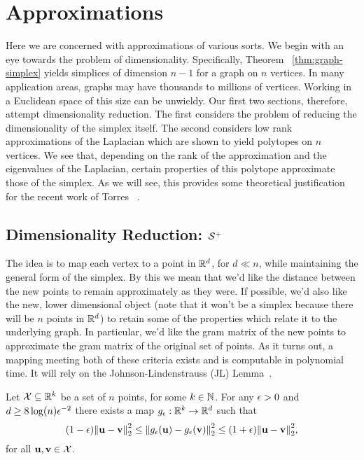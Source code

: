 \section{Approximations} 
\label{sec:algorithmics_approximations}
Here we are concerned  with  approximations of various sorts. We begin  with an eye towards the problem of  dimensionality. Specifically, Theorem ~\ref{thm:graph-simplex} yields simplices of dimension $n-1$ for a graph on $n$ vertices. In  many application areas, graphs may have thousands  to  millions of vertices. Working in a Euclidean space  of  this  size can be unwieldy. Our first two  sections,  therefore, attempt dimensionality reduction. The first  considers the problem of reducing the dimensionality of the simplex itself. The second considers low rank approximations of  the Laplacian which are  shown to yield polytopes on  $n$ vertices. We see that, depending on the rank of the  approximation and the eigenvalues of the Laplacian, certain properties of this polytope approximate  those of the simplex. As we will see, this provides some  theoretical justification for  the  recent work of Torres \etal~\cite{torres2019geometric}. 

\subsection{Dimensionality  Reduction: \texorpdfstring{$\mathcal{S}^+$}{the inverse simplex}}
\label{sec:algorithmics_JL}
The idea is to  map each vertex to a  point in $\mathbb{R}^d$, for $d\ll n$, while maintaining the general form of the simplex. By this we mean that we'd like the distance between the new  points  to remain approximately  as they  were. If possible, we'd also  like the new, lower  dimensional  object (note that it won't  be  a simplex because there will  be  $n$ points in $ \mathbb{R}^d$) to retain some of the properties which  relate it  to the underlying graph. In  particular, we'd like the gram matrix  of the new  points to  approximate the gram  matrix of the original  set  of points. As it turns out,  a  mapping meeting both  of these criteria exists and is computable  in polynomial time. It will   rely on the Johnson-Lindenstrauss  (JL) Lemma~\cite{johnson1984extensions,dasgupta2003elementary}. 

\begin{theorem}
	Let $\mathcal{X}\subseteq \mathbb{R}^k$ be a set of $n$ points, for some $k\in\mathbb{N}$. For any $\epsilon>0$ and $d\geq 8\log(n)\epsilon^{-2}$ there exists a map $g_\epsilon:\mathbb{R}^k\to\mathbb{R}^d$ such that 
	\begin{equation*}
	(1-\epsilon)\norm{\vb{u}-\vb{v}}_2^2 \leq \norm{g_\epsilon(\vb{u}) - g_\epsilon(\vb{v})}_2^2 \leq (1+\epsilon)\norm{\vb{u}-\vb{v}}_2^2,
	\end{equation*}
	for all $\vb{u},\vb{v}\in \mathcal{X}$. 
\end{theorem}

